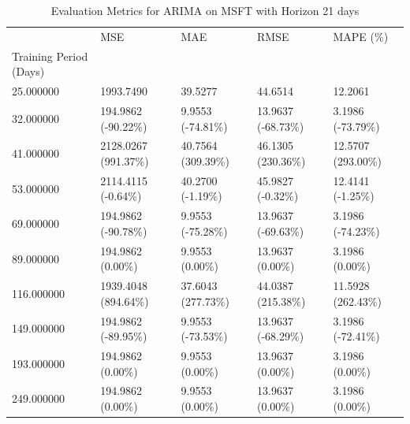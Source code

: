 \begin{table}
\caption{Evaluation Metrics for ARIMA on MSFT with Horizon 21 days}
\label{tab:arima_MSFT_h21_metrics}
\begin{tabular}{lllll}
\toprule
 & MSE & MAE & RMSE & MAPE (\%) \\
Training Period (Days) &  &  &  &  \\
\midrule
25.000000 & 1993.7490 & 39.5277 & 44.6514 & 12.2061 \\
32.000000 & 194.9862 (-90.22\%) & 9.9553 (-74.81\%) & 13.9637 (-68.73\%) & 3.1986 (-73.79\%) \\
41.000000 & 2128.0267 (991.37\%) & 40.7564 (309.39\%) & 46.1305 (230.36\%) & 12.5707 (293.00\%) \\
53.000000 & 2114.4115 (-0.64\%) & 40.2700 (-1.19\%) & 45.9827 (-0.32\%) & 12.4141 (-1.25\%) \\
69.000000 & 194.9862 (-90.78\%) & 9.9553 (-75.28\%) & 13.9637 (-69.63\%) & 3.1986 (-74.23\%) \\
89.000000 & 194.9862 (0.00\%) & 9.9553 (0.00\%) & 13.9637 (0.00\%) & 3.1986 (0.00\%) \\
116.000000 & 1939.4048 (894.64\%) & 37.6043 (277.73\%) & 44.0387 (215.38\%) & 11.5928 (262.43\%) \\
149.000000 & 194.9862 (-89.95\%) & 9.9553 (-73.53\%) & 13.9637 (-68.29\%) & 3.1986 (-72.41\%) \\
193.000000 & 194.9862 (0.00\%) & 9.9553 (0.00\%) & 13.9637 (0.00\%) & 3.1986 (0.00\%) \\
249.000000 & 194.9862 (0.00\%) & 9.9553 (0.00\%) & 13.9637 (0.00\%) & 3.1986 (0.00\%) \\
\bottomrule
\end{tabular}
\end{table}
